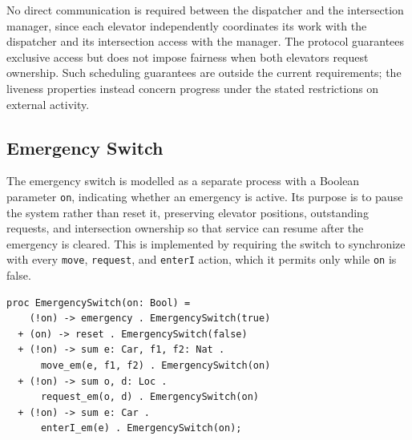 No direct communication is required between the dispatcher and the intersection manager, since each elevator independently coordinates its work with the dispatcher and its intersection access with the manager. The protocol guarantees exclusive access but does not impose fairness when both elevators request ownership. Such scheduling guarantees are outside the current requirements; the liveness properties instead concern progress under the stated restrictions on external activity.

    \subsection{Emergency Switch}
\label{subsec:emergency-switch}

The emergency switch is modelled as a separate process with a Boolean parameter \texttt{on}, indicating whether an emergency is active. Its purpose is to pause the system rather than reset it, preserving elevator positions, outstanding requests, and intersection ownership so that service can resume after the emergency is cleared. This is implemented by requiring the switch to synchronize with every \texttt{move}, \texttt{request}, and \texttt{enterI} action, which it permits only while \texttt{on} is false.

\begin{lstlisting}
proc EmergencySwitch(on: Bool) =
    (!on) -> emergency . EmergencySwitch(true)
  + (on) -> reset . EmergencySwitch(false)
  + (!on) -> sum e: Car, f1, f2: Nat .
      move_em(e, f1, f2) . EmergencySwitch(on)
  + (!on) -> sum o, d: Loc .
      request_em(o, d) . EmergencySwitch(on)
  + (!on) -> sum e: Car .
      enterI_em(e) . EmergencySwitch(on);
\end{lstlisting}

